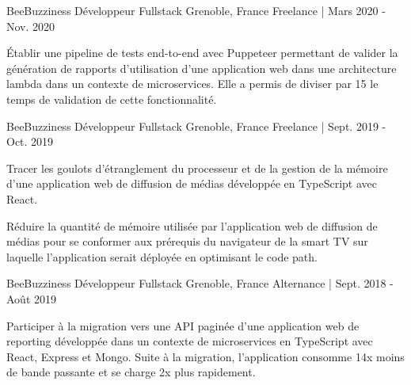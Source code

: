 

\begin{cventries}

  \cventry
  	{BeeBuzziness} %
    {Développeur Fullstack} %
    {Grenoble, France} %
    {Freelance | Mars 2020 - Nov. 2020} %
    {
      \begin{cvitems} %
        \item {Établir une pipeline de tests end-to-end avec Puppeteer permettant de valider la génération de rapports d'utilisation d'une application web dans une architecture lambda dans un contexte de microservices.  
        Elle a permis de diviser par 15 le temps de validation de cette fonctionnalité.}
      \end{cvitems}
    }

  \cventry
  	{BeeBuzziness} %
    {Développeur Fullstack} %
    {Grenoble, France} %
    {Freelance | Sept. 2019 - Oct. 2019} %
    {
      \begin{cvitems} %
        \item {Tracer les goulots d'étranglement du processeur et de la gestion de la mémoire d'une application web de diffusion de médias développée en TypeScript avec React.}
        \item {Réduire la quantité de mémoire utilisée par l'application web de diffusion de médias pour se conformer aux prérequis du navigateur de la smart TV sur laquelle l'application serait déployée en optimisant le code path.}
      \end{cvitems}
    }

  \cventry
  	{BeeBuzziness} %
    {Développeur Fullstack} %
    {Grenoble, France} %
    {Alternance | Sept. 2018 - Août 2019} %
    {
      \begin{cvitems} %
        \item {Participer à la migration vers une API paginée d'une application web de reporting développée dans un contexte de microservices en TypeScript avec React, Express et Mongo.
        Suite à la migration, l'application consomme 14x moins de bande passante et se charge 2x plus rapidement.}
      \end{cvitems}
    }


\end{cventries}
